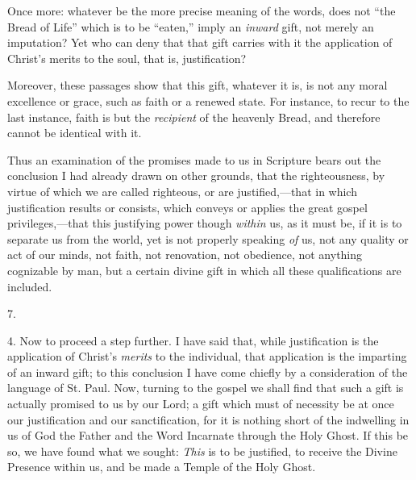 Once more: whatever be the more precise meaning of the words, does
not ``the Bread of Life'' which is to be ``eaten,''
imply an \emph{inward} gift, not merely an imputation? Yet who can
deny that that gift carries with it the application of Christ's merits
to the soul, that is, justification?

Moreover, these passages show that this gift, whatever it is, is
not any moral excellence or grace, such as faith or a renewed state.
For instance, to recur to the last instance, faith is but the \emph{recipient}
of the heavenly Bread, and therefore cannot be identical with it.

Thus an examination of the promises made to us in Scripture bears
out the conclusion I had already drawn on other grounds, that the
righteousness, by virtue of which we are called righteous, or are
justified,—that in which justification results or consists, which
conveys or applies the great gospel privileges,—that this justifying
power though \emph{within} us, as it must be, if it is to
separate us from the world, yet is not properly speaking \emph{of} us,
not any quality or act of our minds, not faith, not renovation, not
obedience, not anything cognizable by man, but a certain divine gift
in which all these qualifications are included.

7.

4. Now to proceed a step further. I have said that, while
justification is the application of Christ's \emph{merits} to the
individual, that application is the imparting of an inward gift; to
this conclusion I have come chiefly by a consideration of the language
of St. Paul. Now, turning to the gospel we shall find that such a gift
is actually promised to us by our Lord; a gift which must of necessity
be at once our justification and our sanctification, for it is nothing
short of the indwelling in us of God the Father and the Word Incarnate
through the Holy Ghost. If this be so, we have found what we sought: \emph{This}
is to be justified, to receive the Divine Presence within us, and be
made a Temple of the Holy Ghost.

